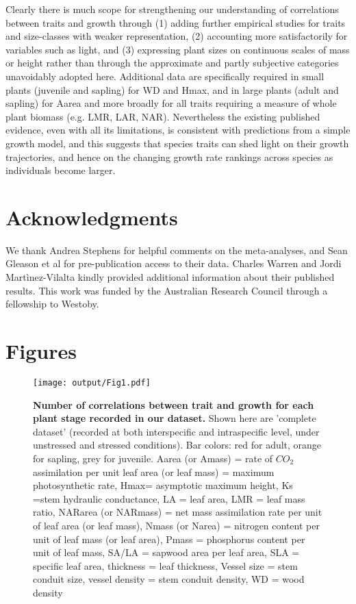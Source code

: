 \documentclass[a4paper]{article}\usepackage[]{graphicx}\usepackage[]{color}
\begin{document}
Clearly there is much scope for strengthening our understanding of correlations between traits and growth through (1) adding further empirical studies for traits and size-classes with weaker representation, (2) accounting more satisfactorily for variables such as light, and (3) expressing plant sizes on continuous scales of mass or height rather than through the approximate and partly subjective categories unavoidably adopted here. Additional data are specifically required in small plants (juvenile and sapling) for WD and Hmax, and in large plants (adult and sapling) for Aarea and more broadly for all traits requiring a measure of whole plant biomass (e.g. LMR, LAR, NAR). Nevertheless the existing published evidence, even with all its limitations, is consistent with predictions from a simple growth model, and this suggests that species traits can shed light on their growth trajectories, and hence on the changing growth rate rankings across species as individuals become larger.



\section*{Acknowledgments}\label{Acknowledgment}

We thank Andrea Stephens for helpful comments on the meta-analyses, and Sean Gleason et al for pre-publication access to their data. Charles Warren and Jordi Martìnez-Vilalta kindly provided additional information about their published results. This work was funded by the Australian Research Council through a fellowship to Westoby.

\clearpage
\linespread{1}

\nocite{*}
\label{references}

\newpage
\section*{Figures}

\begin{figure}[htbp]
\centering
\texttt{[image: output/Fig1.pdf]}
\caption{\textbf{Number of correlations between trait and growth for each plant stage recorded in our dataset.} Shown here are 'complete dataset' (recorded at both interspecific and intraspecific level, under unstressed and stressed conditions). Bar colors: red for adult, orange for sapling, grey for juvenile. Aarea (or Amass) = rate of $CO_{2}$ assimilation per unit leaf area (or leaf mass) = maximum photosynthetic rate, Hmax= asymptotic maximum height,  Ks =stem hydraulic conductance, LA = leaf area, LMR = leaf mass ratio, NARarea (or NARmass) = net mass assimilation rate per unit of leaf area (or leaf mass), Nmass (or Narea) = nitrogen content per unit of leaf mass (or leaf area), Pmass = phosphorus content per unit of leaf mass, SA/LA = sapwood area per leaf area, SLA = specific leaf area, thickness = leaf thickness, Vessel size = stem conduit size, vessel density = stem conduit density, WD = wood density}
\label{Fig1}
\end{figure}
\end{document}
